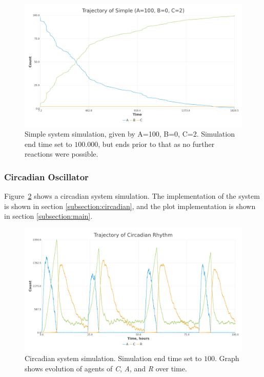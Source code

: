 \begin{figure}[H]
\centering
\includegraphics[width=1\textwidth,height=\textheight,keepaspectratio]{images/simple.png}
\caption{Simple system simulation, given by A=100, B=0, C=2. Simulation end time set to $100.000$, but ends prior to that as no further reactions were possible.}
\label{fig:simple_sim}
\end{figure}

\subsubsection{Circadian Oscillator}
Figure~\ref{fig:circadian_sim} shows a circadian system simulation.
The implementation of the system is shown in section \ref{subsection:circadian}, and the plot implementation is shown in section \ref{subsection:main}.

\begin{figure}[H]
\centering
\includegraphics[width=1\textwidth,height=\textheight,keepaspectratio]{images/circadian.png}
\caption{Circadian system simulation. Simulation end time set to $100$. Graph shows evolution of agents of \textit{C}, \textit{A}, and \textit{R} over time.}
\label{fig:circadian_sim}
\end{figure}

